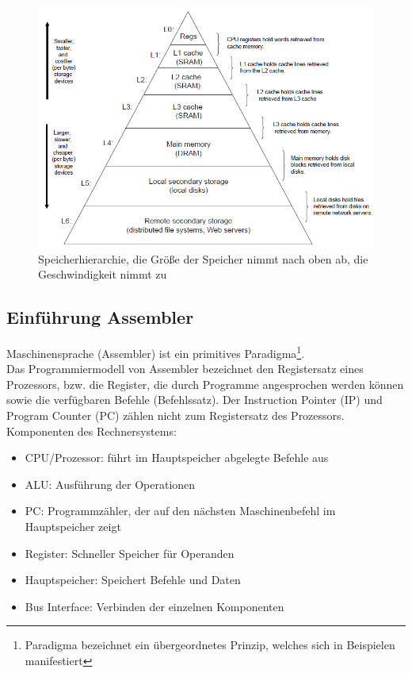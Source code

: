 \documentclass[a4paper,12pt,leqno]{article}
\begin{document}
\begin{figure}[h!]
\centering
\includegraphics[scale=0.5]{Grafiken/Speicherhierarchie.png}
\caption{Speicherhierarchie, die Größe der Speicher nimmt nach oben ab, die Geschwindigkeit nimmt zu}
\label{pic:Speicherhierarchie}
\end{figure}

\subsection{Einführung Assembler}

Maschinensprache (Assembler) ist ein primitives Paradigma\footnote{Paradigma bezeichnet ein übergeordnetes Prinzip, welches sich in Beispielen manifestiert}.\\
Das Programmiermodell von Assembler bezeichnet den Registersatz eines Prozessors, bzw. die Register, die durch Programme angesprochen werden können sowie die verfügbaren Befehle (Befehlssatz). Der Instruction Pointer (IP) und Program Counter (PC) zählen nicht zum Registersatz des Prozessors.\\

Komponenten des Rechnersystems:
\begin{itemize}
\item CPU/Prozessor: führt im Hauptspeicher abgelegte Befehle aus
\item ALU: Ausführung der Operationen
\item PC: Programmzähler, der auf den nächsten Maschinenbefehl im Hauptspeicher zeigt
\item Register: Schneller Speicher für Operanden
\item Hauptspeicher: Speichert Befehle und Daten
\item Bus Interface: Verbinden der einzelnen Komponenten
\end{itemize}
\end{document}
